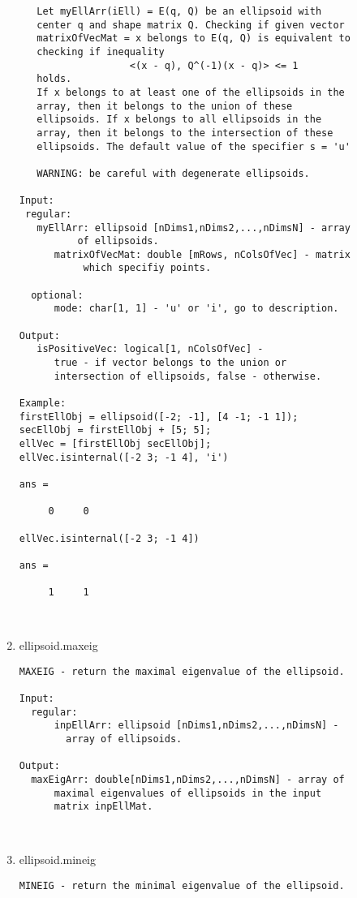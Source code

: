\begin{enumerate}
\begin{lstlisting}
   Let myEllArr(iEll) = E(q, Q) be an ellipsoid with
   center q and shape matrix Q. Checking if given vector
   matrixOfVecMat = x belongs to E(q, Q) is equivalent to
   checking if inequality
                   <(x - q), Q^(-1)(x - q)> <= 1
   holds.
   If x belongs to at least one of the ellipsoids in the
   array, then it belongs to the union of these
   ellipsoids. If x belongs to all ellipsoids in the
   array, then it belongs to the intersection of these
   ellipsoids. The default value of the specifier s = 'u'

   WARNING: be careful with degenerate ellipsoids.

Input:
 regular:
   myEllArr: ellipsoid [nDims1,nDims2,...,nDimsN] - array
          of ellipsoids.
      matrixOfVecMat: double [mRows, nColsOfVec] - matrix
           which specifiy points.

  optional:
      mode: char[1, 1] - 'u' or 'i', go to description.

Output:
   isPositiveVec: logical[1, nColsOfVec] -
      true - if vector belongs to the union or
      intersection of ellipsoids, false - otherwise.

Example:
firstEllObj = ellipsoid([-2; -1], [4 -1; -1 1]);
secEllObj = firstEllObj + [5; 5];
ellVec = [firstEllObj secEllObj];
ellVec.isinternal([-2 3; -1 4], 'i')

ans =

     0     0

ellVec.isinternal([-2 3; -1 4])

ans =

     1     1



\end{lstlisting}
\fontfamily{\familydefault}
\selectfont
\item {ellipsoid.maxeig}
\selectfont
\begin{lstlisting}
MAXEIG - return the maximal eigenvalue of the ellipsoid.

Input:
  regular:
      inpEllArr: ellipsoid [nDims1,nDims2,...,nDimsN] -
        array of ellipsoids.

Output:
  maxEigArr: double[nDims1,nDims2,...,nDimsN] - array of
      maximal eigenvalues of ellipsoids in the input
      matrix inpEllMat.



\end{lstlisting}
\fontfamily{\familydefault}
\selectfont
\item {ellipsoid.mineig}
\selectfont
\begin{lstlisting}
MINEIG - return the minimal eigenvalue of the ellipsoid.


\end{lstlisting}
\end{enumerate}
